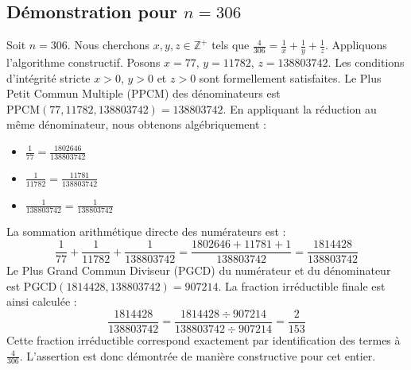 \documentclass[11pt,a4paper]{article}
\begin{document}
\subsection{Démonstration pour $n = 306$}
Soit $n = 306$. Nous cherchons $x, y, z \in \mathbb{Z}^{+}$ tels que $\frac{4}{306} = \frac{1}{x} + \frac{1}{y} + \frac{1}{z}$.
Appliquons l'algorithme constructif. Posons $x = 77$, $y = 11782$, $z = 138803742$.
Les conditions d'intégrité stricte $x > 0$, $y > 0$ et $z > 0$ sont formellement satisfaites.
Le Plus Petit Commun Multiple (PPCM) des dénominateurs est $\text{PPCM}(77, 11782, 138803742) = 138803742$.
En appliquant la réduction au même dénominateur, nous obtenons algébriquement :
\begin{itemize}
    \item $\frac{1}{77} = \frac{1802646}{138803742}$
    \item $\frac{1}{11782} = \frac{11781}{138803742}$
    \item $\frac{1}{138803742} = \frac{1}{138803742}$
\end{itemize}
La sommation arithmétique directe des numérateurs est :
$$ \frac{1}{77} + \frac{1}{11782} + \frac{1}{138803742} = \frac{1802646 + 11781 + 1}{138803742} = \frac{1814428}{138803742} $$
Le Plus Grand Commun Diviseur (PGCD) du numérateur et du dénominateur est $\text{PGCD}(1814428, 138803742) = 907214$.
La fraction irréductible finale est ainsi calculée :
$$ \frac{1814428}{138803742} = \frac{1814428 \div 907214}{138803742 \div 907214} = \frac{2}{153} $$
Cette fraction irréductible correspond exactement par identification des termes à $\frac{4}{306}$. L'assertion est donc démontrée de manière constructive pour cet entier.
\end{document}
